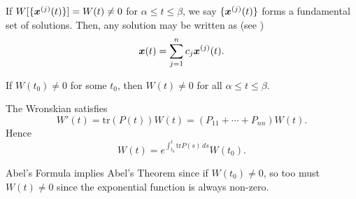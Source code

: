 \begin{theorem}\label{thrm:fundamentalset}
	If $W[\{\bm{x}^{(j)}(t)\}] = W(t) \neq 0$ for $\alpha \leq t \leq \beta$, we say $\{\bm{x}^{(j)}(t)\}$ forms a fundamental set of solutions. Then, any solution may be written as (see )
	\[
	\bm{x}(t) = \sum_{j=1}^n c_j \bm{x}^{(j)}(t).
	\]
\end{theorem}

\begin{theorem}
	If $W(t_0) \neq 0$ for some $t_0$, then $W(t) \neq 0$ for all $\alpha \leq t \leq \beta$.
\end{theorem}

\begin{theorem}
	The Wronskian satisfies
	\[
	W'(t) = \text{tr}(P(t)) W(t) = (P_{11} + \cdots + P_{nn}) W(t).
	\]
	Hence
	\[
	W(t) = e^{\int_{t_0}^t \text{tr} P(s) \,ds} W(t_0).
	\]
\end{theorem}

\begin{remark}
	Abel's Formula implies Abel's Theorem since if $W(t_0) \neq 0$, so too must $W(t) \neq 0$ since the exponential function is always non-zero.
\end{remark}

